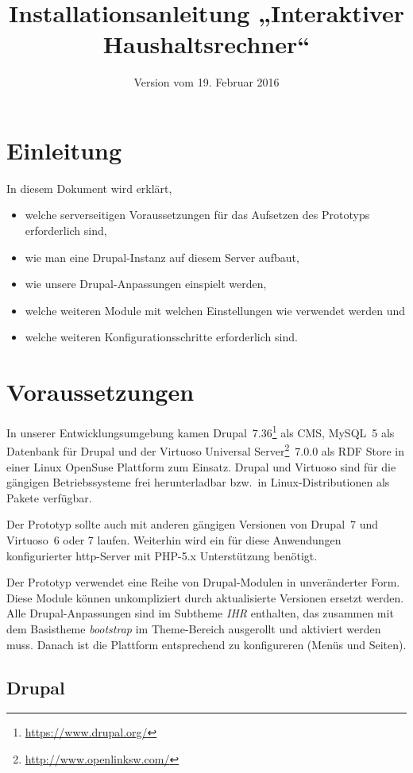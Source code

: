 \documentclass[a4paper,11pt,twoside]{article}
\title{Installationsanleitung „Interaktiver Haushaltsrechner“}
\date{Version vom 19. Februar 2016}
\begin{document}
\maketitle
\tableofcontents
\newpage
\seitezwei
\newpage

\section{Einleitung}
In diesem Dokument wird erklärt, 
\begin{itemize}\itemsep0pt
\item welche serverseitigen Voraussetzungen für das Aufsetzen des Prototyps
  erforderlich sind, 
\item wie man eine Drupal-Instanz auf diesem Server aufbaut, 
\item wie unsere Drupal-Anpassungen einspielt werden, 
\item welche weiteren Module mit welchen Einstellungen wie verwendet werden und
\item welche weiteren Konfigurationsschritte erforderlich sind.
\end{itemize}

\section{Voraussetzungen}
In unserer Entwicklungsumgebung kamen
Drupal~7.36\footnote{\url{https://www.drupal.org/}} als CMS, MySQL~5 als
Datenbank für Drupal und der Virtuoso Universal
Server\footnote{\url{http://www.openlinksw.com/}}~7.0.0 als RDF Store in einer
Linux OpenSuse Plattform zum Einsatz.  Drupal und Virtuoso sind für die
gängigen Betriebssysteme frei herunterladbar bzw.\ in Linux-Distributionen als
Pakete verfügbar.

Der Prototyp sollte auch mit anderen gängigen Versionen von Drupal~7 und
Virtuoso~6 oder 7 laufen.  Weiterhin wird ein für diese Anwendungen
konfigurierter http-Server mit PHP-5.x Unterstützung benötigt.

Der Prototyp verwendet eine Reihe von Drupal-Modulen in unveränderter Form.
Diese Module können unkompliziert durch aktualisierte Versionen ersetzt
werden.  Alle Drupal-Anpassungen sind im Subtheme \emph{IHR} enthalten, das
zusammen mit dem Basistheme \emph{bootstrap} im Theme-Bereich ausgerollt und
aktiviert werden muss. Danach ist die Plattform entsprechend zu konfigureren
(Menüs und Seiten). 

\subsection{Drupal}
\end{document}
